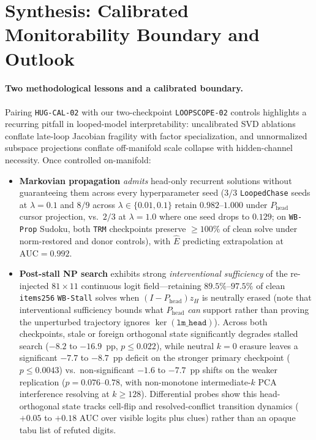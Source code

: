 \documentclass[10pt,letterpaper]{article}
\newcommand{\Phead}{P_{\mathrm{head}}}
\begin{document}
\section{Synthesis: Calibrated Monitorability Boundary and Outlook}\label{sec:discussion}

\paragraph{Two methodological lessons and a calibrated boundary.} Pairing \texttt{HUG-CAL-02} with our two-checkpoint \texttt{LOOPSCOPE-02} controls highlights a recurring pitfall in looped-model interpretability: uncalibrated SVD ablations conflate late-loop Jacobian fragility with factor specialization, and unnormalized subspace projections conflate off-manifold scale collapse with hidden-channel necessity. Once controlled on-manifold:
\begin{itemize}
  \item \textbf{Markovian propagation} \emph{admits} head-only recurrent solutions without guaranteeing them across every hyperparameter seed ($3/3$ \texttt{LoopedChase} seeds at $\lambda=0.1$ and $8/9$ across $\lambda \in \{0.01, 0.1\}$ retain $0.982$--$1.000$ under $\Phead$ cursor projection, vs.\ $2/3$ at $\lambda=1.0$ where one seed drops to $0.129$; on \texttt{WB-Prop} Sudoku, both \texttt{TRM} checkpoints preserve $\ge 100\%$ of clean solve under norm-restored and donor controls), with $\hat{E}$ predicting extrapolation at $\mathrm{AUC}=0.992$.
  \item \textbf{Post-stall NP search} exhibits strong \emph{interventional sufficiency} of the re-injected $81\times 11$ continuous logit field—retaining $89.5\%$--$97.5\%$ of clean \texttt{items256} \texttt{WB-Stall} solves when $(I-\Phead)z_H$ is neutrally erased (note that interventional sufficiency bounds what $\Phead$ \emph{can} support rather than proving the unperturbed trajectory ignores $\ker(\texttt{lm\_head})$). Across both checkpoints, stale or foreign orthogonal state significantly degrades stalled search ($-8.2$ to $-16.9$~pp, $p \le 0.022$), while neutral $k=0$ erasure leaves a significant $-7.7$ to $-8.7$~pp deficit on the stronger primary checkpoint ($p \le 0.0043$) vs.\ non-significant $-1.6$ to $-7.7$~pp shifts on the weaker replication ($p=0.076$--$0.78$, with non-monotone intermediate-$k$ PCA interference resolving at $k \ge 128$). Differential probes show this head-orthogonal state tracks cell-flip and resolved-conflict transition dynamics ($+0.05$ to $+0.18$ AUC over visible logits plus clues) rather than an opaque tabu list of refuted digits.
\end{itemize}
\end{document}
